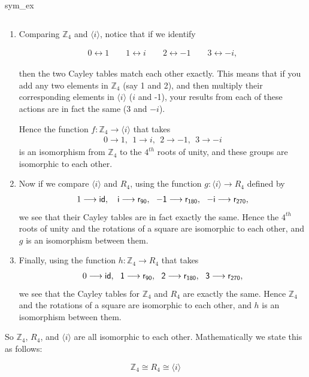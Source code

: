 \begin{example}{sym_ex}
\begin{table}[H]
{\begin{center}
\begin{tabular}{c|cccccccc}
\end{tabular}
\end{center}
}
\end{table}

\begin{enumerate}[(1)]
\item
Comparing ${\mathbb Z_4}$ and $\langle i \rangle$, notice that if we identify 

\begin{align*}
  0 \leftrightarrow 1 \qquad
    1 \leftrightarrow i \qquad
    2 \leftrightarrow -1 \qquad
    3 \leftrightarrow -i, 
\end{align*}
    
then the two Cayley tables match each other exactly.  This means that if you add any two elements in ${\mathbb Z_4}$ (say 1 and 2), and then multiply their corresponding elements in $\langle i \rangle$ ($i$ and -1), your results from each of these actions are in fact the same (3 and $-i$).

Hence the function $f: {\mathbb Z_4} \longrightarrow \langle i \rangle$  that takes 
\begin{align*}
    0 \longrightarrow 1 ,~~     1 \longrightarrow i,~~    2 \longrightarrow -1,~~   3 \longrightarrow -i  
\end{align*}
 is an isomorphism from ${\mathbb Z_4}$ to the $4^{th}$ roots of unity, and these groups are isomorphic to each other.

\item
Now if we compare $\langle i \rangle$ and $R_4$, using the function  $g: \langle i \rangle \longrightarrow R_4$  defined by
\begin{align*}
1 \longrightarrow \sf{id}, ~~\
i \longrightarrow  r_{90},~~
-1 \longrightarrow r_{180},~~
 -i \longrightarrow r_{270}, 
\end{align*}
we see that their Cayley tables are in fact exactly the same.  Hence the $4^{th}$ roots of unity and the rotations of a square are isomorphic to each other, and $g$ is an isomorphism between them.  

\item
Finally, using the  function
$h: {\mathbb Z_4} \longrightarrow R_4$  that takes
\begin{align*}
 0\longrightarrow \sf{id},~~
    1 \longrightarrow r_{90},~~
    2 \longrightarrow r_{180},~~
    3 \longrightarrow r_{270}, 
\end{align*}
we see that the Cayley tables for ${\mathbb Z_4}$ and $R_4$ are exactly the same.  Hence ${\mathbb Z_4}$ and the rotations of a square are isomorphic to each other, and $h$ is an isomorphism between them.
\end{enumerate}

\noindent
So ${\mathbb Z_4}$, $R_4$, and $\langle i \rangle$ are all isomorphic to each other. Mathematically we state this as follows:

\[ {\mathbb Z_4} \cong  R_4 \cong \langle i \rangle \]
 
 \end{example}
 
